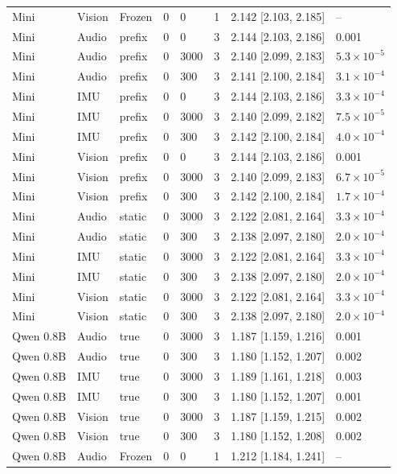 {\begin{longtable}{@{}llllllll@{}}
Mini & Vision & Frozen & 0 & 0 & 1 & 2.142 [2.103, 2.185] & -- \\
Mini & Audio & prefix & 0 & 0 & 3 & 2.144 [2.103, 2.186] & 0.001 \\
Mini & Audio & prefix & 0 & 3000 & 3 & 2.140 [2.099, 2.183] & $5.3\times10^{-5}$ \\
Mini & Audio & prefix & 0 & 300 & 3 & 2.141 [2.100, 2.184] & $3.1\times10^{-4}$ \\
Mini & IMU & prefix & 0 & 0 & 3 & 2.144 [2.103, 2.186] & $3.3\times10^{-4}$ \\
Mini & IMU & prefix & 0 & 3000 & 3 & 2.140 [2.099, 2.182] & $7.5\times10^{-5}$ \\
Mini & IMU & prefix & 0 & 300 & 3 & 2.142 [2.100, 2.184] & $4.0\times10^{-4}$ \\
Mini & Vision & prefix & 0 & 0 & 3 & 2.144 [2.103, 2.186] & 0.001 \\
Mini & Vision & prefix & 0 & 3000 & 3 & 2.140 [2.099, 2.183] & $6.7\times10^{-5}$ \\
Mini & Vision & prefix & 0 & 300 & 3 & 2.142 [2.100, 2.184] & $1.7\times10^{-4}$ \\
Mini & Audio & static & 0 & 3000 & 3 & 2.122 [2.081, 2.164] & $3.3\times10^{-4}$ \\
Mini & Audio & static & 0 & 300 & 3 & 2.138 [2.097, 2.180] & $2.0\times10^{-4}$ \\
Mini & IMU & static & 0 & 3000 & 3 & 2.122 [2.081, 2.164] & $3.3\times10^{-4}$ \\
Mini & IMU & static & 0 & 300 & 3 & 2.138 [2.097, 2.180] & $2.0\times10^{-4}$ \\
Mini & Vision & static & 0 & 3000 & 3 & 2.122 [2.081, 2.164] & $3.3\times10^{-4}$ \\
Mini & Vision & static & 0 & 300 & 3 & 2.138 [2.097, 2.180] & $2.0\times10^{-4}$ \\
Qwen 0.8B & Audio & true & 0 & 3000 & 3 & 1.187 [1.159, 1.216] & 0.001 \\
Qwen 0.8B & Audio & true & 0 & 300 & 3 & 1.180 [1.152, 1.207] & 0.002 \\
Qwen 0.8B & IMU & true & 0 & 3000 & 3 & 1.189 [1.161, 1.218] & 0.003 \\
Qwen 0.8B & IMU & true & 0 & 300 & 3 & 1.180 [1.152, 1.207] & 0.001 \\
Qwen 0.8B & Vision & true & 0 & 3000 & 3 & 1.187 [1.159, 1.215] & 0.002 \\
Qwen 0.8B & Vision & true & 0 & 300 & 3 & 1.180 [1.152, 1.208] & 0.002 \\
Qwen 0.8B & Audio & Frozen & 0 & 0 & 1 & 1.212 [1.184, 1.241] & -- \\

\end{longtable}}
